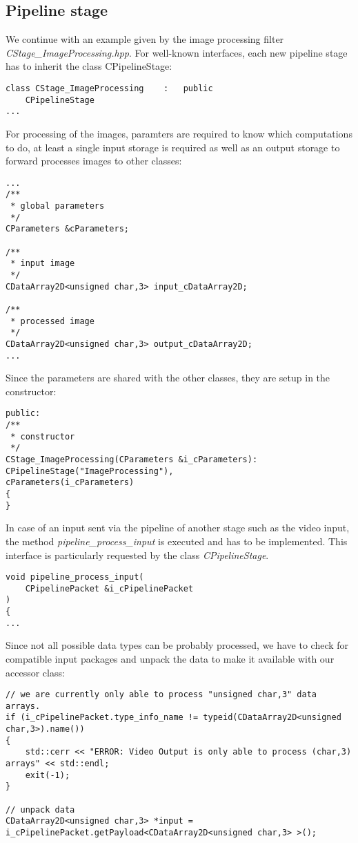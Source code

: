 \documentclass[11pt,a4paper]{article}
\begin{document}
%
\subsection{Pipeline stage}

We continue with an example given by the image processing filter
\textit{CStage\_ImageProcessing.hpp}.
For well-known interfaces, each new pipeline stage has to inherit the class
CPipelineStage:

\begin{lstlisting}
class CStage_ImageProcessing	:	public
	CPipelineStage
...
\end{lstlisting}

\noindent
For processing of the images, paramters are required to know which
computations to do, at least a single input storage is required as well as an
output storage to forward processes images to other classes:

\begin{lstlisting}
...
/**
 * global parameters
 */
CParameters &cParameters;

/**
 * input image
 */
CDataArray2D<unsigned char,3> input_cDataArray2D;

/**
 * processed image
 */
CDataArray2D<unsigned char,3> output_cDataArray2D;
...
\end{lstlisting}

\noindent
Since the parameters are shared with the other classes, they are
setup in the constructor:

\begin{lstlisting}
public:
/**
 * constructor
 */
CStage_ImageProcessing(CParameters &i_cParameters):
CPipelineStage("ImageProcessing"),
cParameters(i_cParameters)
{
}
\end{lstlisting}

\noindent
In case of an input sent via the pipeline of another stage such as the video
input, the method \textit{pipeline\_process\_input} is executed and has to be
implemented. This interface is particularly requested by the class
\textit{CPipelineStage}.

\begin{lstlisting}
void pipeline_process_input(
	CPipelinePacket &i_cPipelinePacket
)
{
...
\end{lstlisting}

\noindent
Since not all possible data types can be probably processed, we have to check
for compatible input packages and unpack the data to make it available with our
accessor class:
\begin{lstlisting}
// we are currently only able to process "unsigned char,3" data arrays.
if (i_cPipelinePacket.type_info_name != typeid(CDataArray2D<unsigned char,3>).name())
{
	std::cerr << "ERROR: Video Output is only able to process (char,3) arrays" << std::endl;
	exit(-1);
}

// unpack data
CDataArray2D<unsigned char,3> *input = i_cPipelinePacket.getPayload<CDataArray2D<unsigned char,3> >();
\end{lstlisting}
\end{document}

